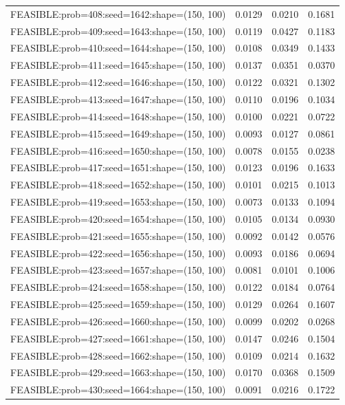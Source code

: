 \begin{longtable}{lccc}
FEASIBLE:prob=408:seed=1642:shape=(150, 100) & 0.0129 & 0.0210 & 0.1681 \\
FEASIBLE:prob=409:seed=1643:shape=(150, 100) & 0.0119 & 0.0427 & 0.1183 \\
FEASIBLE:prob=410:seed=1644:shape=(150, 100) & 0.0108 & 0.0349 & 0.1433 \\
FEASIBLE:prob=411:seed=1645:shape=(150, 100) & 0.0137 & 0.0351 & 0.0370 \\
FEASIBLE:prob=412:seed=1646:shape=(150, 100) & 0.0122 & 0.0321 & 0.1302 \\
FEASIBLE:prob=413:seed=1647:shape=(150, 100) & 0.0110 & 0.0196 & 0.1034 \\
FEASIBLE:prob=414:seed=1648:shape=(150, 100) & 0.0100 & 0.0221 & 0.0722 \\
FEASIBLE:prob=415:seed=1649:shape=(150, 100) & 0.0093 & 0.0127 & 0.0861 \\
FEASIBLE:prob=416:seed=1650:shape=(150, 100) & 0.0078 & 0.0155 & 0.0238 \\
FEASIBLE:prob=417:seed=1651:shape=(150, 100) & 0.0123 & 0.0196 & 0.1633 \\
FEASIBLE:prob=418:seed=1652:shape=(150, 100) & 0.0101 & 0.0215 & 0.1013 \\
FEASIBLE:prob=419:seed=1653:shape=(150, 100) & 0.0073 & 0.0133 & 0.1094 \\
FEASIBLE:prob=420:seed=1654:shape=(150, 100) & 0.0105 & 0.0134 & 0.0930 \\
FEASIBLE:prob=421:seed=1655:shape=(150, 100) & 0.0092 & 0.0142 & 0.0576 \\
FEASIBLE:prob=422:seed=1656:shape=(150, 100) & 0.0093 & 0.0186 & 0.0694 \\
FEASIBLE:prob=423:seed=1657:shape=(150, 100) & 0.0081 & 0.0101 & 0.1006 \\
FEASIBLE:prob=424:seed=1658:shape=(150, 100) & 0.0122 & 0.0184 & 0.0764 \\
FEASIBLE:prob=425:seed=1659:shape=(150, 100) & 0.0129 & 0.0264 & 0.1607 \\
FEASIBLE:prob=426:seed=1660:shape=(150, 100) & 0.0099 & 0.0202 & 0.0268 \\
FEASIBLE:prob=427:seed=1661:shape=(150, 100) & 0.0147 & 0.0246 & 0.1504 \\
FEASIBLE:prob=428:seed=1662:shape=(150, 100) & 0.0109 & 0.0214 & 0.1632 \\
FEASIBLE:prob=429:seed=1663:shape=(150, 100) & 0.0170 & 0.0368 & 0.1509 \\
FEASIBLE:prob=430:seed=1664:shape=(150, 100) & 0.0091 & 0.0216 & 0.1722 \\

\end{longtable}
